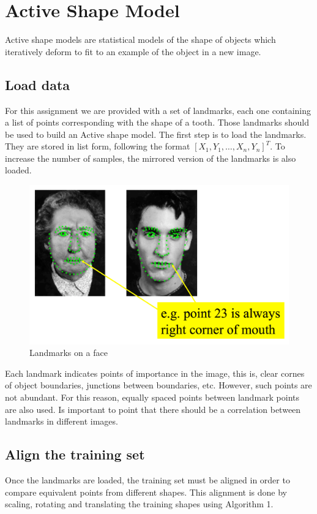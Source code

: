 \section{Active Shape Model}

Active shape models are statistical models of the shape
of objects which iteratively deform to fit to an example
of the object in a new image.

\subsection{Load data}
For this assignment we are provided with a set of landmarks, each one
containing a list of points corresponding with the shape of a tooth.
Those landmarks should be used to build an Active shape model.
The first step is to load the landmarks. They are stored in list form,
following the format ${[X_1, Y_1, \ldots, X_n, Y_n]}^T$. To increase
the number of samples, the mirrored version of the landmarks is also
loaded.

\begin{figure}[h]
  \centering
  \includegraphics[width=0.7\linewidth]{img/landmarks}
  \caption{Landmarks on a face}
\end{figure}

Each landmark indicates points of importance in the image, this is,
clear cornes of object boundaries, junctions between boundaries, etc.
However, such points are not abundant. For this reason, equally spaced
points between landmark points are also used.
Is important to point that there should be a correlation between landmarks
in different images.

\subsection{Align the training set}
Once the landmarks are loaded, the training set must be aligned in
order to compare equivalent points from different shapes. This
alignment is done by scaling, rotating and translating the training
shapes using Algorithm 1.

